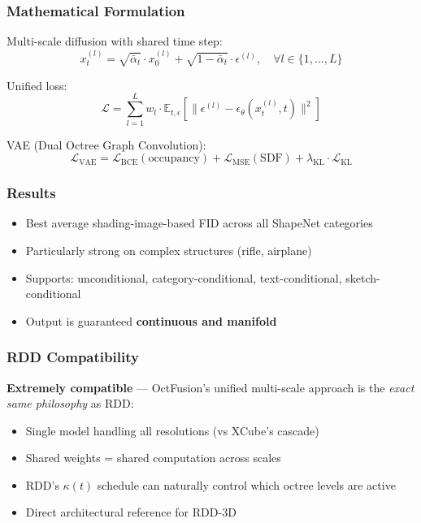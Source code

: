 \documentclass[11pt, a4paper]{article}
\newcommand{\alphabar}{\bar{\alpha}}
\begin{document}
\subsubsection{Mathematical Formulation}

Multi-scale diffusion with shared time step:
\begin{equation}
    x_t^{(l)} = \sqrt{\alphabar_t} \cdot x_0^{(l)} + \sqrt{1-\alphabar_t} \cdot \epsilon^{(l)}, \quad \forall l \in \{1,...,L\}
\end{equation}

Unified loss:
\begin{equation}
    \mathcal{L} = \sum_{l=1}^{L} w_l \cdot \mathbb{E}_{t,\epsilon}\left[\|\epsilon^{(l)} - \epsilon_\theta(x_t^{(l)}, t)\|^2\right]
\end{equation}

VAE (Dual Octree Graph Convolution):
\begin{equation}
    \mathcal{L}_{\text{VAE}} = \mathcal{L}_{\text{BCE}}(\text{occupancy}) + \mathcal{L}_{\text{MSE}}(\text{SDF}) + \lambda_{\text{KL}} \cdot \mathcal{L}_{\text{KL}}
\end{equation}

\subsubsection{Results}

\begin{itemize}
    \item Best average shading-image-based FID across all ShapeNet categories
    \item Particularly strong on complex structures (rifle, airplane)
    \item Supports: unconditional, category-conditional, text-conditional, sketch-conditional
    \item Output is guaranteed \textbf{continuous and manifold}
\end{itemize}

\subsubsection{RDD Compatibility}

\textbf{Extremely compatible} --- OctFusion's unified multi-scale approach is the \emph{exact same philosophy} as RDD:
\begin{itemize}
    \item Single model handling all resolutions (vs XCube's cascade)
    \item Shared weights = shared computation across scales
    \item RDD's $\kappa(t)$ schedule can naturally control which octree levels are active
    \item Direct architectural reference for RDD-3D
\end{itemize}
\end{document}
